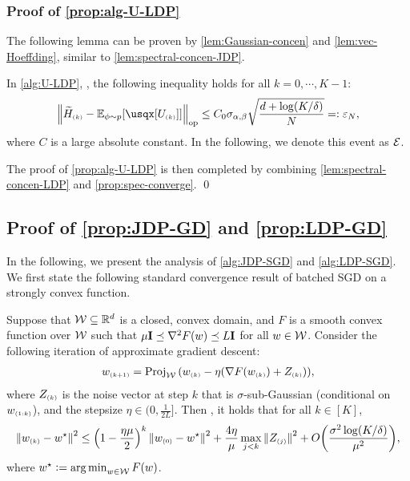 \subsubsection{Proof of \cref{prop:alg-U-LDP}}


The following lemma can be proven by \cref{lem:Gaussian-concen} and \cref{lem:vec-Hoeffding}, similar to \cref{lem:spectral-concen-JDP}.
\begin{lemma}\label{lem:spectral-concen-LDP}
In \cref{alg:U-LDP}, \whp, the following inequality holds for all $k=0,\cdots,K-1$:
\begin{align}
    \nrmop{\til H\kk-\Ep{\usqx[U\kk]}}\leq C_0\siga\sqrt\frac{d+\log(K/\delta)}{N}=:\epsN,
\end{align}
where $C$ is a large absolute constant. In the following, we denote this event as $\mathcal{E}$.
\end{lemma}
The proof of \cref{prop:alg-U-LDP} is then completed by combining \cref{lem:spectral-concen-LDP} and \cref{prop:spec-converge}.
\qed










\subsection{Proof of \cref{prop:JDP-GD} and \cref{prop:LDP-GD}}

In the following, we present the analysis of \cref{alg:JDP-SGD} and \cref{alg:LDP-SGD}. We first state the following standard convergence result of batched SGD on a strongly convex function.

\newcommand{\iind}[1]{\epk{#1}}
\newcommand{\us}{w^\star}
\begin{proposition}\label{prop:B-SGD-general}
Suppose that $\mathcal{W}\subseteq \mathbb{R}^d$ is a closed, convex domain, and $F$ is a smooth convex function over $\mathcal{W}$ such that $\mu\mathbf{I}\preceq \nabla^2 F(w)\preceq L\mathbf{I}$ for all $w\in\mathcal{W}$. Consider the following iteration of approximate gradient descent:
\begin{align}\label{eq:B-SGD-general}
    w\iind{k+1}=\Proj_\cW\paren{w\iind{k}-\eta \paren{\nabla F(w\iind{k}) + Z\iind{k}} },
\end{align}
where $Z\iind{k}$ is the noise vector at step $k$ that is $\sigma$-sub-Gaussian (conditional on $w\iind{1:k}$), and the stepsize $\eta\in(0,\frac{1}{2L}]$. Then \whp, it holds that for all $k\in[K]$,
\begin{align*}
    \nrm{w\iind{k}-\us}^2\leq \paren{ 1-\frac{\eta\mu}{2} }^k\nrm{w\iind{0}-\us}^2+\frac{4\eta}{\mu}\max_{j<k}\nrm{Z\iind{j}}^2+\bigO{\frac{\sigma^2\log(K/\delta)}{\mu^2}},
\end{align*}
where $\us\defeq \argmin_{w\in\cW} F(w)$.
\end{proposition}

